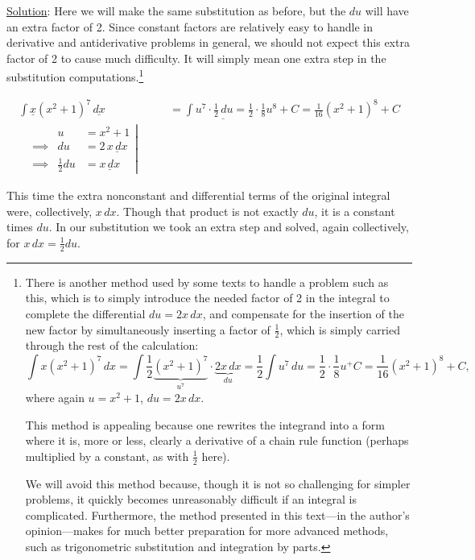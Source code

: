 \underline{Solution}: Here we will make the same substitution
as before, but the $du$ will have an extra factor of 2.  Since
constant factors are relatively easy to handle in derivative
and antiderivative problems in general, we should not expect
this extra factor of 2 to cause much difficulty.  It 
will simply mean one extra step in the  substitution
computations.\footnote{%
There is another method used by some texts to handle a 
problem such as this, which is to simply introduce the
needed factor of 2 in the integral to complete the
differential $du=2x\,dx$, and compensate for the insertion of
the new factor by
simultaneously inserting a factor of $\frac12$, which
is simply carried through the rest of the calculation:
$$\int x(x^2+1)^7\,dx=\int\frac12
 \underbrace{(x^2+1)^7}_{u^7}\cdot\underbrace{2x\,dx}_{du}
 =\frac12\int u^7\,du=\frac12\cdot\frac18u^+C=\frac1{16}(x^2+1)^8+C,$$
where again $u=x^2+1$, $du=2x\,dx$.

This method is appealing because one rewrites the integrand into a form
where it is, more or less, clearly a derivative of a chain rule function
(perhaps multiplied by a constant, as with $\frac12$ here).

We will avoid this method because, though it is not so challenging for
simpler problems, it quickly becomes unreasonably difficult if an
integral is complicated.  Furthermore, the method presented in this
text---in the author's opinion---makes for much 
better preparation for more advanced methods,
such as trigonometric substitution and integration by parts.
}

\begin{align*}
\int \underline{x}(x^2+1)^7\,\underline{dx}
         &=\int u^7\cdot\underline{\frac12\,du}=\frac12\cdot
                \frac18u^8+C=\frac1{16}(x^2+1)^8+C\\
\left.\begin{alignedat}{2}
&&u&=x^2+1\\
&\implies& du&=2\,\underline{x\,dx}\\ &\implies&\frac12du&=\underline{x\,dx}
\end{alignedat}\right|\qquad&\end{align*}
\label{IntX(X^2+1)^7dxExample}\eex

This time the extra nonconstant and differential terms of the original
integral were, collectively, $x\,dx$.  Though that product is not
exactly $du$, it is a constant times $du$. In our substitution
we took an extra step and solved, again collectively, for $x\,dx=\frac12du$.


